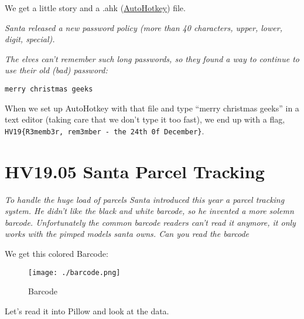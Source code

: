 \documentclass[11pt]{article}
\begin{document}
We get a little story and a .ahk
(\href{https://www.autohotkey.com/}{AutoHotkey}) file.

\emph{Santa released a new password policy (more than 40 characters,
upper, lower, digit, special).}

\emph{The elves can't remember such long passwords, so they found a way
to continue to use their old (bad) password:}

\texttt{merry\ christmas\ geeks}

    When we set up AutoHotkey with that file and type ``merry christmas
geeks'' in a text editor (taking care that we don't type it too fast),
we end up with a flag,
\texttt{HV19\{R3memb3r,\ rem3mber\ -\ the\ 24th\ 0f\ December\}}.

    
\pagebreak{}
    \hypertarget{hv19.05-santa-parcel-tracking}{%
\section{HV19.05 Santa Parcel
Tracking}\label{hv19.05-santa-parcel-tracking}}

\emph{To handle the huge load of parcels Santa introduced this year a
parcel tracking system. He didn't like the black and white barcode, so
he invented a more solemn barcode. Unfortunately the common barcode
readers can't read it anymore, it only works with the pimped models
santa owns. Can you read the barcode}

We get this colored Barcode:

\begin{figure}
\centering
\texttt{[image: ./barcode.png]}
\caption{Barcode}
\end{figure}

Let's read it into Pillow and look at the data.
\end{document}
